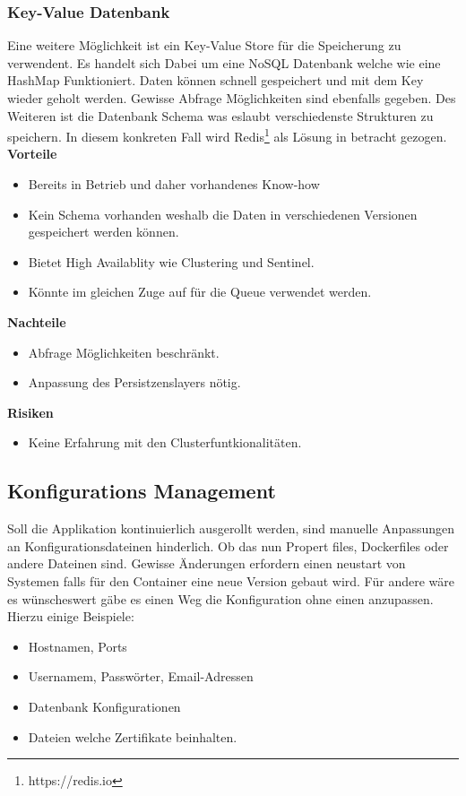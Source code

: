 \subsubsection{Key-Value Datenbank}

Eine weitere Möglichkeit ist ein Key-Value Store für die Speicherung zu verwendent. Es handelt sich Dabei um eine \gls{NoSQL} Datenbank welche wie eine HashMap Funktioniert. Daten können schnell gespeichert und mit dem Key wieder geholt werden. Gewisse Abfrage Möglichkeiten sind ebenfalls gegeben. Des Weiteren ist die Datenbank Schema was eslaubt verschiedenste Strukturen zu speichern. In diesem konkreten Fall wird Redis\footnote{https://redis.io} als Lösung in betracht gezogen. \newline
\newline
\textbf{Vorteile}
\begin{itemize}
	\item Bereits in Betrieb und daher vorhandenes Know-how
	\item Kein Schema vorhanden weshalb die Daten in verschiedenen Versionen gespeichert werden können.
	\item Bietet High Availablity wie Clustering und Sentinel.
	\item Könnte im gleichen Zuge auf für die Queue verwendet werden.	
\end{itemize}
\textbf{Nachteile}
\begin{itemize}
	\item Abfrage Möglichkeiten beschränkt.
	\item Anpassung des Persistzenslayers nötig.
\end{itemize}
\textbf{Risiken}
\begin{itemize}
	\item Keine Erfahrung mit den Clusterfuntkionalitäten.
\end{itemize}

\subsection{Konfigurations Management}

Soll die Applikation kontinuierlich ausgerollt werden, sind manuelle Anpassungen an Konfigurationsdateinen hinderlich. Ob das nun Propert files, Dockerfiles oder andere Dateinen sind. Gewisse Änderungen erfordern einen neustart von Systemen falls für den Container eine neue Version gebaut wird. Für andere wäre es wünscheswert gäbe es einen Weg die Konfiguration ohne einen anzupassen. Hierzu einige Beispiele:\newline
\begin{itemize}
	\item Hostnamen, Ports
	\item Usernamem, Passwörter, Email-Adressen
	\item Datenbank Konfigurationen
	\item Dateien welche Zertifikate beinhalten.
\end{itemize}

